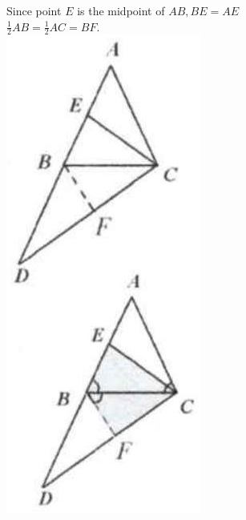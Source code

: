 \documentclass[10pt]{article}
\begin{document}
Since point \(E\) is the midpoint of \(A B, B E=A E\)\\
\(\frac{1}{2} A B=\frac{1}{2} A C=B F\).\\
\includegraphics[max width=\textwidth, center]{2025_04_17_97bc1f7e44d93c271a88g-118(2)}
\end{document}
